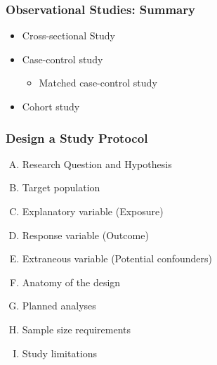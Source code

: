 \documentclass[table,10pt]{beamer}
\begin{document}
\begin{CJK*}{UTF8}{gbsn}
\begin{frame}[t]
\frametitle{Observational Studies: Summary}
\begin{itemize}
	\item<1-> Cross-sectional Study
	\item<2-> Case-control study
	\begin{itemize}
		\item<2-> Matched case-control study
	\end{itemize}
	\item<3-> Cohort study
\end{itemize}
\end{frame}


\begin{frame}[t]
\frametitle{Design a Study Protocol}
\begin{enumerate}[(A)]
	\item Research Question and Hypothesis 
	\item Target population
	\item Explanatory variable (Exposure)
	\item Response variable (Outcome)
	\item Extraneous variable (Potential confounders)
	\item Anatomy of the design
	\item Planned analyses
	\item Sample size requirements
	\item Study limitations
\end{enumerate}
\end{frame}


\begin{frame}
\end{frame}

\end{CJK*}
\end{document}
